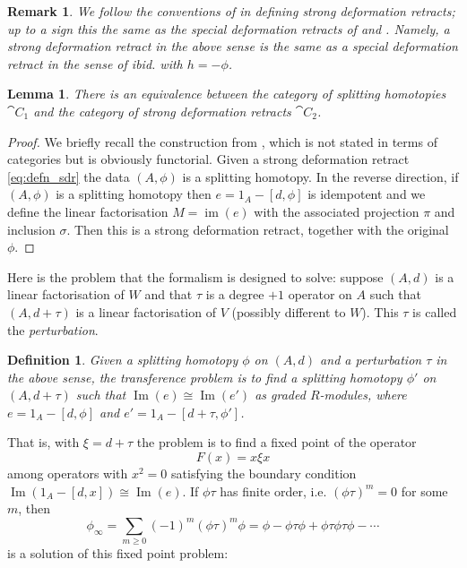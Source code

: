 \documentclass[english,letter paper,12pt,leqno]{article}
\newtheorem{lemma}[theorem]{Lemma}
\theoremstyle{example}
\newtheorem{definition}[theorem]{Definition}
\newtheorem{remark}[theorem]{Remark}
\numberwithin{equation}{section}
\def\im{\operatorname{Im}}
\begin{document}
\begin{remark}\label{remark:strongdefosigns} We follow the conventions of \cite{barneslambe} in defining strong deformation retracts; up to a sign this the same as the special deformation retracts of \cite{crainic} and \cite{dm1102.2957}. Namely, a strong deformation retract in the above sense is the same as a special deformation retract in the sense of \emph{ibid.} with $h = - \phi$.
\end{remark}

\begin{lemma}\label{lemma:equivocate} There is an equivalence between the category of splitting homotopies $\cat{C}_1$ and the category of  strong deformation retracts $\cat{C}_2$.
\end{lemma}
\begin{proof}
We briefly recall the construction from \cite[p.883]{barneslambe}, which is not stated in terms of categories but is obviously functorial. Given a strong deformation retract \eqref{eq:defn_sdr} the data $(A, \phi)$ is a splitting homotopy. In the reverse direction, if $(A, \phi)$ is a splitting homotopy then $e = 1_A - [d, \phi]$ is idempotent and we define the linear factorisation $M = \operatorname{im}(e)$ with the associated projection $\pi$ and inclusion $\sigma$. Then this is a strong deformation retract, together with the original $\phi$.
\end{proof}

Here is the problem that the formalism is designed to solve: suppose $(A,d)$ is a linear factorisation of $W$ and that $\tau$ is a degree $+1$ operator on $A$ such that $(A, d + \tau)$ is a linear factorisation of $V$ (possibly different to $W$). This $\tau$ is called the \emph{perturbation}.

\begin{definition} Given a splitting homotopy $\phi$ on $(A,d)$ and a perturbation $\tau$ in the above sense, the \emph{transference problem} is to find a splitting homotopy $\phi'$ on $(A, d + \tau)$ such that $\im(e) \cong \im(e')$ as graded $R$-modules, where $e = 1_A - [d, \phi]$ and $e' = 1_A - [d + \tau, \phi']$. 
\end{definition}

That is, with $\xi = d + \tau$ the problem is to find a fixed point of the operator
\[
F(x) = x \xi x
\]
among operators with $x^2 = 0$ satisfying the boundary condition $\im(1_A - [d,x]) \cong \im(e)$. If $\phi \tau$ has finite order, i.e. $(\phi \tau)^m = 0$ for some $m$, then
\begin{equation}\label{eq:formula_phi_infty}
\phi_\infty = \sum_{m \ge 0} (-1)^m (\phi \tau)^m \phi = \phi - \phi \tau \phi + \phi \tau \phi \tau \phi - \cdots
\end{equation}
is a solution of this fixed point problem:
\end{document}
